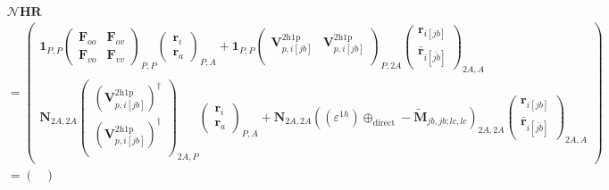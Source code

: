\begin{align}
&    \bm{\mathcal{N}} \bm{H} \bm{R}\\
&= 
\begin{pmatrix}
\bm{1}_{P,P}
 \begin{pmatrix}
\bm{F}_{oo} & \bm{F}_{ov} \\ \bm{F}_{vo} & \bm{F}_{vv}
\end{pmatrix}_{P,P} \begin{pmatrix}
\bm{r}_i \\ \bm{r}_a
\end{pmatrix}_{P,A} + \bm{1}_{P,P}\begin{pmatrix}
    \bm{V}^{2 \mathrm{h1p}}_{p,i[jb]} & \bm{V}^{2 \mathrm{h1p}}_{p,i[{jb}]} \\
\end{pmatrix}_{P,2A} \begin{pmatrix}
    \bm{r}_{i[jb]} \\
\bm{\bar{r}}_{i[\bar{jb}]}
\end{pmatrix}_{2A,A} \\[6pt]
 \bm{N}_{2A,2A}\begin{pmatrix}
    \left(\bm{V}^{2 \mathrm{h1p}}_{p,i[jb]}\right)^\dag \\ \left(\bm{V}^{2 \mathrm{h1p}}_{p,i[{jb}]}\right)^\dag \\
\end{pmatrix}_{2A,P} \begin{pmatrix}
\bm{r}_i \\ \bm{r}_a
\end{pmatrix}_{P,A} +
\bm{N}_{2A,2A}\left(\left(\varepsilon^{1h}\right) \oplus_{\text{direct}} -\bm{\tilde{M}}_{jb,jb;lc,lc}\right)_{2A,2A} \begin{pmatrix}
    \bm{r}_{i[jb]} \\
\bm{\bar{r}}_{i[\bar{jb}]}
\end{pmatrix}_{2A,A}
\end{pmatrix} \\
&= \begin{pmatrix}

\end{pmatrix}
\end{align}
